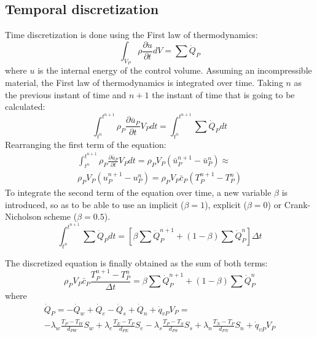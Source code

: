\subsection{Temporal discretization}
\label{TemporalDiscretizationConduction}
Time discretization is done using the First law of thermodynamics:
\begin{equation}
\int_{V_{P}}^{}\rho\frac{\partial u}{\partial t}dV=\sum\dot{Q}_{P}
\end{equation}
where $u$ is the internal energy of the control volume.
Assuming an incompressible material, the First law of thermodynamics is integrated over time. Taking $n$ as the previous instant of time and $n+1$ the instant of time that is going to be calculated:
\begin{equation}
\int_{t^{n}}^{t^{n+1}}\rho_{P}\frac{\partial\bar{u}_{P}}{\partial t}V_{P}dt=\int_{t^{n}}^{t^{n+1}}\sum\dot{Q}_{P}dt
\end{equation}
Rearranging the first term of the equation:
\begin{multline}
\int_{t^{n}}^{t^{n+1}}\rho_{P}\frac{\partial\bar{u}_{P}}{\partial t}V_{P}dt=\rho_{P}V_{P}\left(\bar{u}_{P}^{n+1}-\bar{u}_{P}^{n}\right)\approx \\
\rho_{P}V_{P}\left(u_{P}^{n+1}-u_{P}^{n}\right)=\rho_{P}V_{P}\bar{c}_{P}\left(T_{P}^{n+1}-T_{P}^{n}\right)
\end{multline}
To integrate the second term of the equation over time, a new variable $\beta$ is introduced, so as to be able to use an implicit ($\beta=1$), explicit ($\beta=0$) or Crank-Nicholson scheme ($\beta=0.5$).
\begin{equation}
\int_{t^{n}}^{t^{n+1}}\sum\dot{Q}_{P}dt=\left[\beta\sum\dot{Q}_{P}^{n+1}+\left(1-\beta\right)\sum\dot{Q}_{P}^{n}\right]\Delta t
\end{equation}

The discretized equation is finally obtained as the sum of both terms:
\begin{equation}
\rho_{P}V_{P}\bar{c}_{P}\frac{T_{P}^{n+1}-T_{P}^{n}}{\Delta t}=\beta\sum\dot{Q}_{P}^{n+1}+\left(1-\beta\right)\sum\dot{Q}_{P}^{n}
\end{equation}
where
\begin{multline}
	\dot{Q}_{P}=-\dot{Q}_{w}+\dot{Q}_{e}-\dot{Q}_{s}+\dot{Q}_{n}+\dot{q}_{vP}V_{P}= \\
	-\lambda_{w}\frac{T_{P}-T_{W}}{d_{PW}}S_{w}+\lambda_{e}\frac{T_{E}-T_{P}}{d_{PE}}S_{e}-\lambda_{s}\frac{T_{P}-T_{S}}{d_{PS}}S_{s}+\lambda_{n}\frac{T_{N}-T_{P}}{d_{PN}}S_{n}+\dot{q}_{vP}V_{P}
\end{multline}

